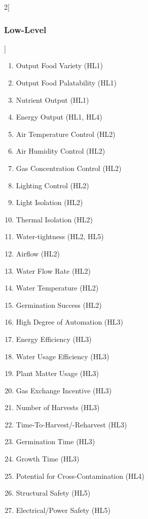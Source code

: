 \documentclass{report}
\begin{document}
\begin{multicols}{2}[\subsubsection{Low-Level}\label{sec:llos}]
    \begin{enumerate}
        \item Output Food Variety \hfill (HL1)
        \item Output Food Palatability \hfill (HL1)
        \item Nutrient Output \hfill (HL1)
        \item Energy Output \hfill (HL1, HL4)
        \item Air Temperature Control \hfill (HL2)
        \item Air Humidity Control \hfill (HL2)
        \item Gas Concentration Control \hfill (HL2)
        \item Lighting Control \hfill (HL2)
        \item Light Isolation \hfill (HL2)
        \item Thermal Isolation \hfill (HL2)
        \item Water-tightness \hfill (HL2, HL5)
        \item Airflow \hfill (HL2)
        \item Water Flow Rate \hfill (HL2)
        \item Water Temperature \hfill (HL2)
        \item Germination Success \hfill (HL2)
        \item High Degree of Automation \hfill (HL3)
        \item Energy Efficiency \hfill (HL3)
        \item Water Usage Efficiency \hfill (HL3)
        \item Plant Matter Usage \hfill (HL3)
        \item Gas Exchange Incentive \hfill (HL3)
        \item Number of Harvests \hfill (HL3)
        \item Time-To-Harvest/-Reharvest \hfill (HL3)
        \item Germination Time \hfill (HL3)
        \item Growth Time \hfill (HL3)
        \item Potential for Cross-Contamination \hfill (HL4)
        \item Structural Safety \hfill (HL5)
        \item Electrical/Power Safety \hfill (HL5)

\end{enumerate}
\end{multicols}
\end{document}
